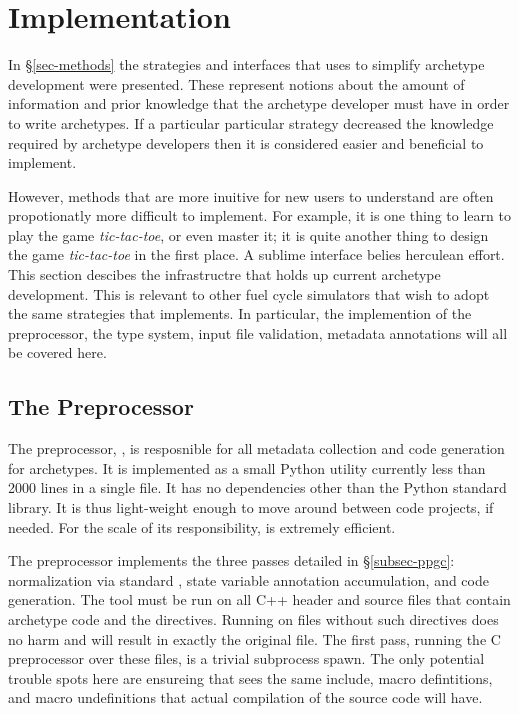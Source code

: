 \section{Implementation}
\label{sec-impl}

In \S \ref{sec-methods} the strategies and interfaces that \Cyclus uses to 
simplify archetype development were presented. These represent notions about
the amount of information and prior knowledge that the archetype developer 
must have in order to write archetypes.  If a particular particular strategy 
decreased the knowledge required by archetype developers then it is considered
easier and beneficial to implement.  

However, methods that are more inuitive for new users to understand are often
propotionatly more difficult to implement. For example, it is one thing to 
learn to play the game \emph{tic-tac-toe}, or even master it; it is quite another
thing to design the game \emph{tic-tac-toe} in the first place.  
A sublime interface belies 
herculean effort. This section descibes the infrastructre that holds up 
current \cyclus archetype development.  This is relevant to other fuel 
cycle simulators that wish to adopt the same strategies that \cyclus 
implements. In particular, the implemention of the \cyclus preprocessor, 
the type system, input file validation, metadata annotations will all 
be covered here.

\subsection{The \Cyclus Preprocessor}

The \cyclus preprocessor, \cycpp, is resposnible for all metadata collection and 
code generation for archetypes. It is implemented as a small Python utility 
currently less than 2000 lines in a single file.  It has no dependencies other 
than the Python standard library. It is thus light-weight enough to move around 
between code projects, if needed. For the scale of its responsibility, \cycpp
is extremely efficient. 

The preprocessor implements the three passes detailed in \S\ref{subsec-ppgc}:
normalization via standard , state variable annotation accumulation, and code 
generation. The \cycpp tool must be run on all C++ header and source files that
contain archetype code and the  directives. Running \cycpp
on files without such directives does no harm and will result in exactly the 
original file. The first \cycpp
pass, running the C preprocessor over these files, is a trivial subprocess 
spawn. The only potential trouble spots here are ensureing that \cycpp sees the
same include, macro defintitions, and macro undefinitions that actual compilation 
of the source code will have.

